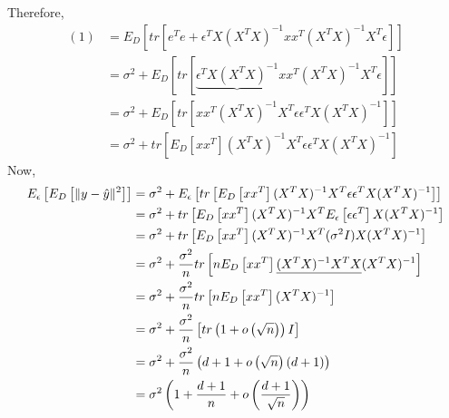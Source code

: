 \documentclass[17pt]{article}
\DeclarePairedDelimiter\norm{\lVert}{\rVert}%
\begin{document}
Therefore,
\begin{equation*}
\begin{split}
(1) 
	&= E_{D} \left[ tr \left[ 
			e^Te 
			+ \epsilon^T X(X^TX)^{-1}xx^T(X^TX)^{-1}X^T\epsilon	 
		\right] \right]\\
	&= \sigma^2 
		+ E_{D} \left[ tr \left[ 
			\underbrace{\epsilon^T X(X^TX)^{-1}}
			xx^T(X^TX)^{-1}X^T\epsilon
		 \right] \right]\\
	&= \sigma^2 
		+ E_{D} \left[ tr \left[ 
			xx^T(X^TX)^{-1}X^T\epsilon
			\epsilon^T X(X^TX)^{-1}
		 \right] \right]\\
	&= \sigma^2 
		+ tr \left[   E_{D}\left[ xx^T \right]
			(X^TX)^{-1}X^T\epsilon
			\epsilon^T X(X^TX)^{-1}
		 \right]
\end{split}
\end{equation*}
Now,
\begin{equation*}
\begin{split}
E_{\epsilon} \left[ E_{D} \left[ \norm{y - \hat{y} }^2 \right] \right]
	&=  \sigma^2 
		+ E_{\epsilon} \left[
			 tr \left[   
			 	E_{D}\left[ xx^T \right]
				(X^TX)^{-1} X^T \epsilon\epsilon^T 
				X(X^TX)^{-1}	 
			\right]
 		 \right]\\
 	&=  \sigma^2 
		+ tr \left[   
			E_{D}\left[ xx^T \right]
			(X^TX)^{-1} X^T
			E_{\epsilon} \left[ \epsilon\epsilon^T \right] 						X(X^TX)^{-1}	 
		  \right]\\
 	&=  \sigma^2
		+ tr \left[   
			E_{D}\left[ xx^T \right]
			(X^TX)^{-1} X^T
			(\sigma^2 I)
			X(X^TX)^{-1}	 
 		 \right]\\
 	&=  \sigma^2
		+ \frac{\sigma^2}{n}
			 tr \left[   
				n E_{D}\left[ xx^T \right]
				\underline{(X^TX)^{-1} X^TX} (X^TX)^{-1}	 
 		 \right]\\
 	&=  \sigma^2
		+ \frac{\sigma^2}{n}
			 tr \left[   
				n E_{D}\left[ xx^T \right]
				(X^TX)^{-1}	 
 		 \right]\\
 	&=  \sigma^2
		+ \frac{\sigma^2}{n}  \left[
			 tr \left( 1 + o \left(\sqrt{n}\right) \right)I   	
 		 \right]\\
 	&=  \sigma^2
		+ \frac{\sigma^2}{n}  \left(
		 d + 1 + o \left(\sqrt{n}\right)(d+1)   	
 		 \right)\\
 	&=  \sigma^2 \left(
		1 + \frac{d+1}{n} + o\left( \frac{d+1}{\sqrt{n}} \right)    		 \right)\\
\end{split}
\end{equation*}
\newpage
\end{document}
